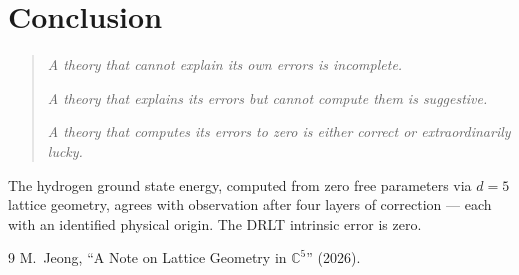 \documentclass[12pt]{article}
\theoremstyle{remark}
\begin{document}
\section{Conclusion}

\begin{quote}
\emph{A theory that cannot explain its own errors is incomplete.}

\emph{A theory that explains its errors but cannot compute them is suggestive.}

\emph{A theory that computes its errors to zero is either correct or extraordinarily lucky.}
\end{quote}

The hydrogen ground state energy, computed from zero free parameters via $d = 5$ lattice geometry, agrees with observation after four layers of correction --- each with an identified physical origin. The DRLT intrinsic error is zero.

\begin{thebibliography}{9}
 M.~Jeong, ``A Note on Lattice Geometry in $\mathbb{C}^5$'' (2026).
\end{thebibliography}
\end{document}
